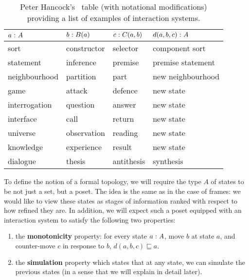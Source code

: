 \begin{table}[tbp]
  \centering
  \caption{%
    Peter Hancock's~\cite{hancock-interaction-systems} table (with notational
    modifications) providing a list of examples of interaction systems.
  }
  \label{tab:hancock}
  \begin{tabular}{l | l | l | l}
    $a\hspace{0.1mm}:\hspace{0.1mm}A$ & $b\hspace{0.1mm}:\hspace{0.1mm}B(a)$ & $c\hspace{0.1mm}:\hspace{0.1mm}C(a, b)$ & $d(a, b, c)\hspace{0.1mm}:\hspace{0.1mm}A$ \\\hline
    sort           & constructor       & selector             & component sort          \\
    statement      & inference         & premise              & premise statement       \\
    neighbourhood  & partition         & part                 & new neighbourhood       \\
    game           & attack            & defence              & new state               \\
    interrogation  & question          & answer               & new state               \\
    interface      & call              & return               & new state               \\
    universe       & observation       & reading              & new state               \\
    knowledge      & experience        & result               & new state               \\
    dialogue       & thesis            & antithesis           & synthesis               \\
  \end{tabular}
\end{table}

To define the notion of a formal topology, we will require the type $A$ of states to be
not just a set, but a poset. The idea is the same as in the case of frames: we would like
to view these states as stages of information ranked with respect to how refined they are.
In addition, we will expect such a poset equipped with an interaction system to satisfy
the following two properties:
\begin{enumerate}
\item the \textbf{monotonicity} property: for every state $a\hspace{0.1mm}:\hspace{0.1mm}A$, move
  $b$ at state $a$, and counter-move $c$ in response to $b$, $d(a, b, c) \sqsubseteq a$.
  \item the \textbf{simulation} property which states that at any state, we can simulate
    the previous states (in a sense that we will explain in detail later).
\end{enumerate}

